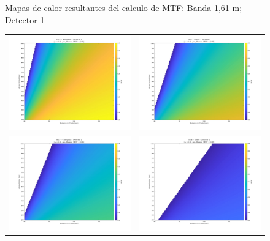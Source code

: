 \begin{landscape}
\begin{figure}[p]
\caption{Mapas de calor resultantes del calculo de MTF: Banda 1,61 \textmu m; Detector 1}
\end{figure}
\end{landscape}


\begin{landscape}
\begin{figure}[p]
\centering
\setlength{\tabcolsep}{2pt}
\renewcommand{\arraystretch}{0}

\begin{tabular}{cc}
\includegraphics[width=0.48\linewidth]{4.Payload/MTF/MTF_Lambda1_Detector2_Telescopio1_heatmap.jpg} &
\includegraphics[width=0.48\linewidth]{4.Payload/MTF/MTF_Lambda1_Detector2_Telescopio2_heatmap.jpg} \\
\includegraphics[width=0.48\linewidth]{4.Payload/MTF/MTF_Lambda1_Detector2_Telescopio3_heatmap.jpg} &
\includegraphics[width=0.48\linewidth]{4.Payload/MTF/MTF_Lambda1_Detector2_Telescopio4_heatmap.jpg} \\
\end{tabular}


\end{figure}
\end{landscape}
